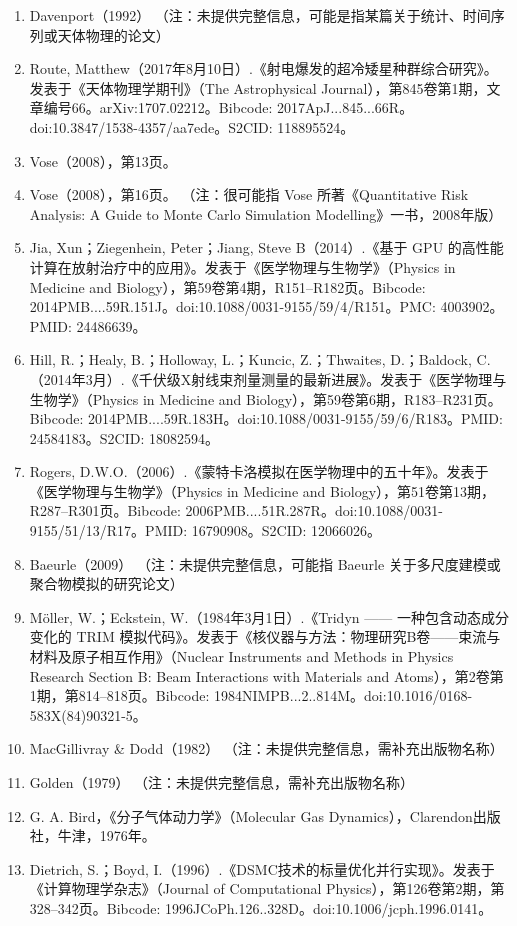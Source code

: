 \begin{enumerate}
\item Davenport（1992）
（注：未提供完整信息，可能是指某篇关于统计、时间序列或天体物理的论文）
\item Route, Matthew（2017年8月10日）.《射电爆发的超冷矮星种群综合研究》。发表于《天体物理学期刊》（The Astrophysical Journal），第845卷第1期，文章编号66。arXiv:1707.02212。Bibcode: 2017ApJ...845...66R。doi:10.3847/1538-4357/aa7ede。S2CID: 118895524。
\item Vose（2008），第13页。
\item Vose（2008），第16页。
（注：很可能指 Vose 所著《Quantitative Risk Analysis: A Guide to Monte Carlo Simulation Modelling》一书，2008年版）
\item Jia, Xun；Ziegenhein, Peter；Jiang, Steve B（2014）.《基于 GPU 的高性能计算在放射治疗中的应用》。发表于《医学物理与生物学》（Physics in Medicine and Biology），第59卷第4期，R151–R182页。Bibcode: 2014PMB....59R.151J。doi:10.1088/0031-9155/59/4/R151。PMC: 4003902。PMID: 24486639。
\item Hill, R.；Healy, B.；Holloway, L.；Kuncic, Z.；Thwaites, D.；Baldock, C.（2014年3月）.《千伏级X射线束剂量测量的最新进展》。发表于《医学物理与生物学》（Physics in Medicine and Biology），第59卷第6期，R183–R231页。Bibcode: 2014PMB....59R.183H。doi:10.1088/0031-9155/59/6/R183。PMID: 24584183。S2CID: 18082594。
\item Rogers, D.W.O.（2006）.《蒙特卡洛模拟在医学物理中的五十年》。发表于《医学物理与生物学》（Physics in Medicine and Biology），第51卷第13期，R287–R301页。Bibcode: 2006PMB....51R.287R。doi:10.1088/0031-9155/51/13/R17。PMID: 16790908。S2CID: 12066026。
\item Baeurle（2009）
（注：未提供完整信息，可能指 Baeurle 关于多尺度建模或聚合物模拟的研究论文）
\item Möller, W.；Eckstein, W.（1984年3月1日）.《Tridyn —— 一种包含动态成分变化的 TRIM 模拟代码》。发表于《核仪器与方法：物理研究B卷——束流与材料及原子相互作用》（Nuclear Instruments and Methods in Physics Research Section B: Beam Interactions with Materials and Atoms），第2卷第1期，第814–818页。Bibcode: 1984NIMPB...2..814M。doi:10.1016/0168-583X(84)90321-5。
\item MacGillivray & Dodd（1982）
（注：未提供完整信息，需补充出版物名称）
\item Golden（1979）
（注：未提供完整信息，需补充出版物名称）
\item G. A. Bird，《分子气体动力学》（Molecular Gas Dynamics），Clarendon出版社，牛津，1976年。
\item Dietrich, S.；Boyd, I.（1996）.《DSMC技术的标量优化并行实现》。发表于《计算物理学杂志》（Journal of Computational Physics），第126卷第2期，第328–342页。Bibcode: 1996JCoPh.126..328D。doi:10.1006/jcph.1996.0141。

\end{enumerate}
